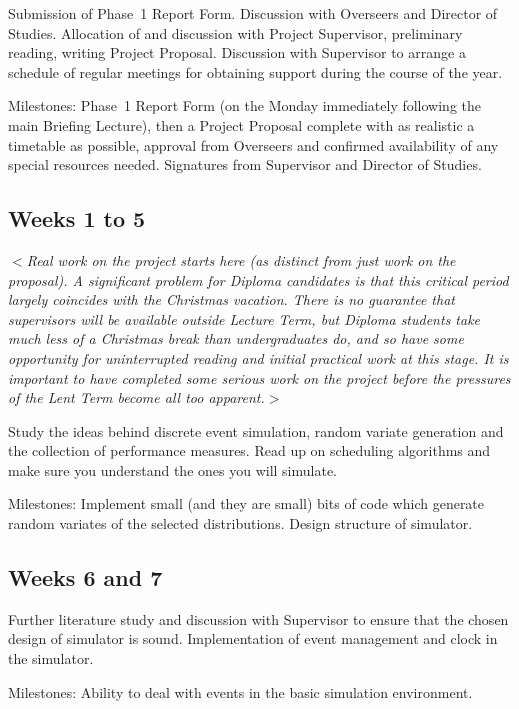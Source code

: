 \documentclass[12pt]{article}
\newcommand{\al}{$<$}
\newcommand{\ar}{$>$}
\begin{document}
Submission of Phase~1 Report Form. Discussion with Overseers and
Director of Studies.  Allocation of and discussion with Project
Supervisor, preliminary reading, writing Project Proposal.  Discussion
with Supervisor to arrange a schedule of regular meetings for
obtaining support during the course of the year.

Milestones: Phase~1 Report Form (on the Monday immediately following
the main Briefing Lecture), then a Project Proposal complete with as
realistic a timetable as possible, approval from Overseers and
confirmed availability of any special resources needed. Signatures
from Supervisor and Director of Studies.


\subsection*{Weeks 1 to 5}

\al\emph{Real work on the project starts here (as distinct from just
  work on the proposal).  A significant problem for Diploma candidates
  is that this critical period largely coincides with the Christmas
  vacation.  There is no guarantee that supervisors will be available
  outside Lecture Term, but Diploma students take much less of a
  Christmas break than undergraduates do, and so have some opportunity
  for uninterrupted reading and initial practical work at this stage.
  It is important to have completed some serious work on the project
  before the pressures of the Lent Term become all too apparent.}\ar

Study the ideas behind discrete event simulation, random variate
generation and the collection of performance measures.  Read up on
scheduling algorithms and make sure you understand the ones you will
simulate.

Milestones: Implement small (and they are small) bits of code which
generate random variates of the selected distributions.  Design
structure of simulator.


\subsection*{Weeks 6 and 7}

Further literature study and discussion with Supervisor to ensure that
the chosen design of simulator is sound.  Implementation of event
management and clock in the simulator.

Milestones: Ability to deal with events in the basic simulation
environment.
\end{document}
